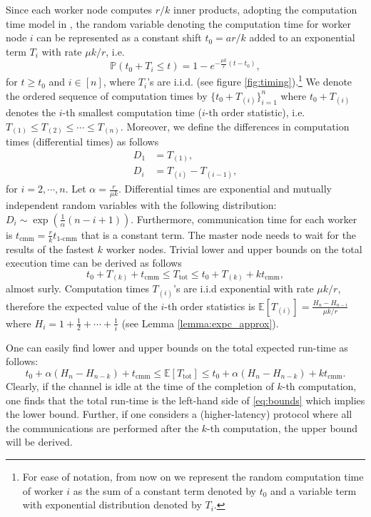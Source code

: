 \documentclass[onecolumn,journal,twoside]{IEEEtran}
\newcommand{\Prob}{\mathbb{P}}
\newcommand{\Expc}{\mathbb{E}}
\begin{document}
Since each worker node computes $r/k$ inner products, adopting the computation time model in \cite{lee2016speeding}, the random variable denoting the computation time for worker node $i$ can be represented as a constant shift $t_0=ar/k$ added to an exponential term $T_i$ with rate $\mu k/r$, i.e.
\begin{equation}
\Prob(t_0+T_i\leq t) = 1-e^{-\frac{\mu k}{r}(t-t_0)},
\end{equation}
for $t\geq t_0$ and $i \in [n]$, where $T_i$'s are i.i.d.  (see figure \ref{fig:timing}).\footnote{For ease of notation, from now on we represent the random computation time of worker $i$ as the sum of a constant term denoted by $t_0$ and a variable term with exponential distribution denoted by $T_i$.} We denote the ordered sequence of computation times by $\{t_0+T_{(i)}\}_{i=1}^n$  where $t_0+T_{(i)}$ denotes the $i$-th smallest computation time ($i$-th order statistic), i.e. $T_{(1)} \leq T_{(2)} \leq \cdots \leq T_{(n)}$. Moreover, we define the differences in computation times (differential times) as follows 
\begin{align}
D_1 &= T_{(1)},\nonumber\\
D_i &= T_{(i)} - T_{(i-1)},
\end{align}
for $i=2,\cdots,n$. Let $\alpha=\frac{r}{\mu k}$. Differential times are exponential and mutually independent random variables with the following distribution: $D_i \sim \exp(\frac{1}{\alpha}(n-i+1))$. Furthermore, communication time for each worker is $t_{\text{cmm}}=\frac{r}{k}t_{\text{1-cmm}}$ that is a constant term. The master node needs to wait for the results of the fastest $k$ worker nodes. Trivial lower and upper bounds on the total execution time can be derived as follows
\begin{equation}
    t_0+T_{(k)} + t_{\text{cmm}} \leq T_{\text{tot}} \leq t_0+ T_{(k)} + kt_{\text{cmm}},
\end{equation}
almost surly. Computation times $T_{(i)}$'s are i.i.d exponential with rate $\mu k/r$, therefore the expected value of the $i$-th order statistics is $\Expc[T_{(i)}]=\frac{H_n - H_{n-i}}{\mu k/r}$ where $H_i=1+\frac{1}{2}+\cdots+ \frac{1}{i}$ (see Lemma \ref{lemma:expc_approx}). 

One can easily find lower and upper bounds on the total expected run-time as follows: 
\begin{equation}\label{eq:bounds}
    t_0+\alpha (H_n - H_{n-k}) + t_{\text{cmm}} \leq \Expc[T_{\text{tot}} ]\leq t_0+ \alpha (H_n - H_{n-k}) + kt_{\text{cmm}}.
\end{equation}
Clearly, if the channel is idle at the time of the completion of $k$-th computation, one finds that the total run-time is the left-hand side of \eqref{eq:bounds} which implies the lower bound. Further, if one considers a (higher-latency) protocol where all the communications are performed after the $k$-th computation, the upper bound will be derived.
\end{document}
